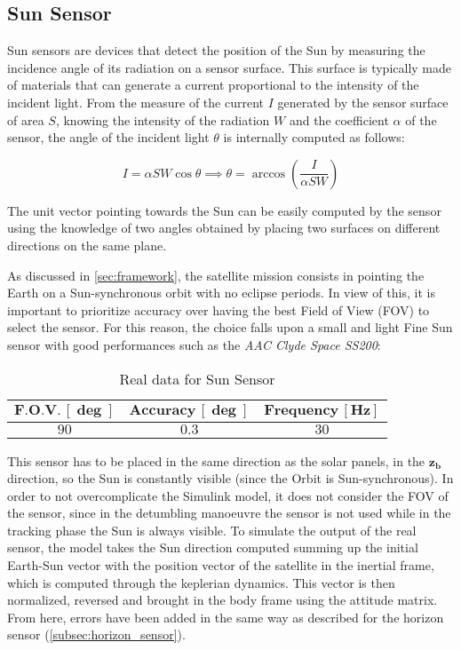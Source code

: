 \pagebreak
\subsection{Sun Sensor}
\label{subsec:sun_sensor}

Sun sensors are devices that detect the position of the Sun by measuring the incidence angle of its radiation on a sensor surface. This surface is typically made of materials that can generate a current proportional to the intensity of the incident light. From the measure of the current $I$ generated by the sensor surface of area $S$, knowing the intensity of the radiation $W$ and the coefficient $\alpha$ of the sensor, the angle of the incident light $\theta$ is internally computed as follows:

\begin{equation}
    I = \alpha S W \cos \theta  \implies  \theta = \arccos \left( \frac{I}{\alpha S W} \right)
\end{equation}

The unit vector pointing towards the Sun can be easily computed by the sensor using the knowledge of two angles obtained by placing two surfaces on different directions on the same plane.

As discussed in \autoref{sec:framework}, the satellite mission consists in pointing the Earth on a Sun-synchronous orbit with no eclipse periods. In view of this, it is important to prioritize accuracy over having the best Field of View (FOV) to select the sensor. For this reason, the choice falls upon a small and light Fine Sun sensor with good performances such as the \textit{AAC Clyde Space SS200}:
\begin{table}[H]

    \centering
    
    \begin{tabular}{|c|c|c|}
    \hline
    $\bm{F.O.V. \, [\deg]}$ & $\bm{Accuracy \, [\deg]}$ & $\bm{Frequency \, [Hz]}$ \\
    \hline
    $90$ & $0.3$ & $30$  \\
    \hline
    \end{tabular}
    
    \caption{Real data for Sun Sensor}
    \label{table:Sun_sensor}
    
\end{table}

This sensor has to be placed in the same direction as the solar panels, in the $\boldsymbol{z_b}$ direction, so the Sun is constantly visible (since the Orbit is Sun-synchronous). In order to not overcomplicate the Simulink model, it does not consider the FOV of the sensor, since in the detumbling manoeuvre the sensor is not used while in the tracking phase the Sun is always visible.
To simulate the output of the real sensor, the model takes the Sun direction computed summing up the initial Earth-Sun vector with the position vector of the satellite in the inertial frame, which is computed through the keplerian dynamics. This vector is then normalized, reversed and brought in the body frame using the attitude matrix. From here, errors have been added in the same way as described for the horizon sensor (\autoref{subsec:horizon_sensor}).

